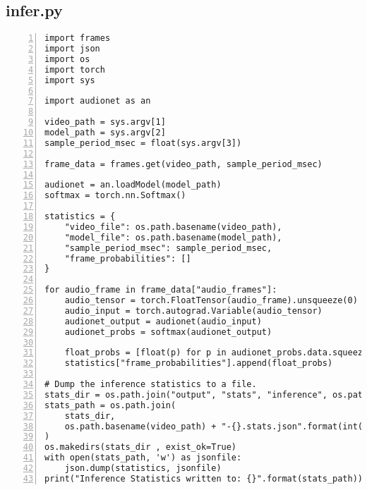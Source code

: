 \subsection{infer.py}
\label{subsec:infer.py}

{\setlength{\fboxsep}{10pt}
\scriptsize
\begin{Verbatim}[frame=leftline, numbers=left, xleftmargin=5mm]
import frames
import json
import os
import torch
import sys

import audionet as an

video_path = sys.argv[1]
model_path = sys.argv[2]
sample_period_msec = float(sys.argv[3])

frame_data = frames.get(video_path, sample_period_msec)

audionet = an.loadModel(model_path)
softmax = torch.nn.Softmax()

statistics = {
    "video_file": os.path.basename(video_path),
    "model_file": os.path.basename(model_path),
    "sample_period_msec": sample_period_msec,
    "frame_probabilities": []
}

for audio_frame in frame_data["audio_frames"]:
    audio_tensor = torch.FloatTensor(audio_frame).unsqueeze(0)
    audio_input = torch.autograd.Variable(audio_tensor)
    audionet_output = audionet(audio_input)
    audionet_probs = softmax(audionet_output)

    float_probs = [float(p) for p in audionet_probs.data.squeeze(0)]
    statistics["frame_probabilities"].append(float_probs)

# Dump the inference statistics to a file.
stats_dir = os.path.join("output", "stats", "inference", os.path.basename(model_path))
stats_path = os.path.join(
    stats_dir,
    os.path.basename(video_path) + "-{}.stats.json".format(int(sample_period_msec))
)
os.makedirs(stats_dir , exist_ok=True)
with open(stats_path, 'w') as jsonfile:
    json.dump(statistics, jsonfile)
print("Inference Statistics written to: {}".format(stats_path))
\end{Verbatim}
}
